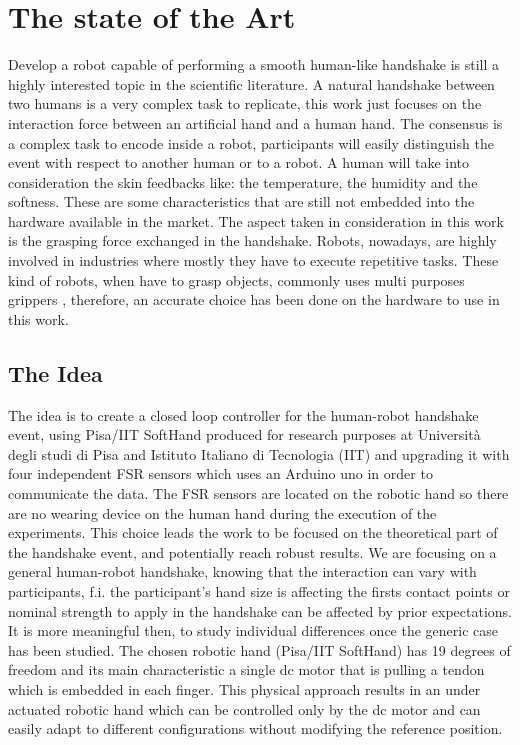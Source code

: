 

\chapter{The state of the Art}
Develop a robot capable of performing a smooth human-like handshake is still a highly interested topic in the scientific literature.
A natural handshake between two humans is a very complex task to replicate, this work just focuses on the interaction force between an artificial hand and a human hand.
The consensus is a complex task to encode inside a robot, participants will easily distinguish the event with respect to another human or to a robot. A human will take into consideration the skin feedbacks like: the temperature, the humidity and the softness. These are some characteristics that are still not embedded into the hardware available in the market. The aspect taken in consideration in this work is the grasping force exchanged in the handshake. 
Robots, nowadays, are highly involved in industries where mostly they have to execute repetitive tasks. These kind of robots, when have to grasp objects, commonly uses multi purposes grippers \cite{multipurposegripper}, therefore, an accurate choice has been done on the hardware to use in this work. 


\cite{facialexpressions}
\cite{mirrorgame}
\cite{papageorgiou}

\section{The Idea}
The idea is to create a closed loop controller for the human-robot handshake event, using Pisa/IIT SoftHand produced for research purposes at Universit\`a degli studi di Pisa and Istituto Italiano di Tecnologia (IIT) and upgrading it with four independent FSR sensors which uses an Arduino uno in order to communicate the data.
The FSR sensors are located on the robotic hand so there are no wearing device on the human hand during the execution of the experiments.
This choice leads the work to be focused on the theoretical part of the handshake event, and potentially reach robust results. We are focusing on a general human-robot handshake, knowing that the interaction can vary with participants, f.i. the participant's hand size is affecting the firsts contact points or nominal strength to apply in the handshake can be affected by prior expectations. It is more meaningful then, to study individual differences once the generic case has been studied.
The chosen robotic hand (Pisa/IIT SoftHand) has 19 degrees of freedom and its main characteristic a single dc motor that is pulling a tendon which is embedded in each finger. This physical approach results in an under actuated robotic hand which can be controlled only by the dc motor and can easily adapt to different configurations without modifying the reference position. 

